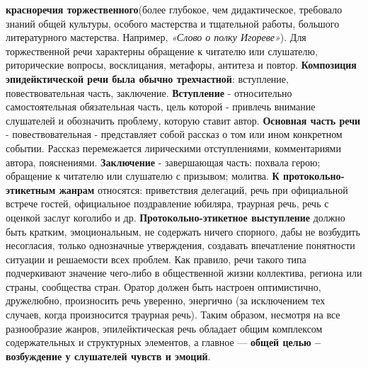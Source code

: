 \textbf{красноречия торжественного}(более глубокое, чем дидактическое, требовало знаний общей культуры, особого мастерства и тщательной работы, большого литературного мастерства. Например, \textit{«Слово о полку Игореве»}). Для торжественной речи характерны обращение к читателю или слушателю, риторические вопросы, восклицания, метафоры, антитеза и повтор. \textbf{Композиция эпидейктической речи была обычно трехчастной}: вступление, повествовательная часть, заключение. \textbf{Вступление} - относительно самостоятельная обязательная часть, цель которой - привлечь внимание слушателей и обозначить проблему, которую ставит автор. \textbf{Основная часть речи} - повествовательная - представляет собой рассказ о том или ином конкретном событии. Рассказ перемежается лирическими отступлениями, комментариями автора, пояснениями. \textbf{Заключение} - завершающая часть: похвала герою; обращение к читателю или слушателю с призывом; молитва.\textbf{ К протокольно-этикетным жанрам} относятся: приветствия делегаций, речь при официальной встрече гостей, официальное поздравление юбиляра, траурная речь, речь с оценкой заслуг коголибо и др. \textbf{Протокольно-этикетное выступление} должно быть кратким, эмоциональным, не содержать ничего спорного, дабы не возбудить несогласия, только однозначные утверждения, создавать впечатление понятности ситуации и решаемости всех проблем. Как правило, речи такого типа подчеркивают значение чего-либо в общественной жизни коллектива, региона или страны, сообщества стран. Оратор должен быть настроен оптимистично, дружелюбно, произносить речь уверенно, энергично (за исключением тех случаев, когда произносится траурная речь). Таким образом, несмотря на все разнообразие жанров, эпилейктическая речь обладает общим комплексом содержательных и структурных элементов, а главное — \textbf{общей целью -- возбуждение у слушателей чувств и эмоций}. 
